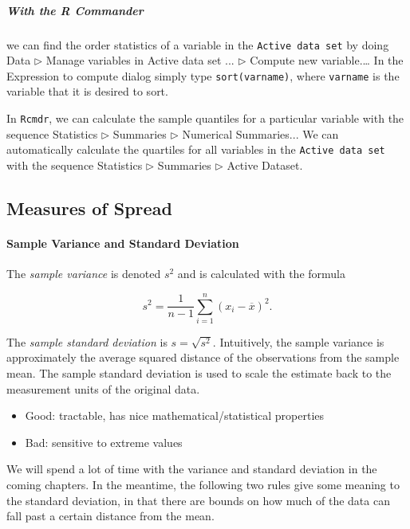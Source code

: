 \documentclass[captions=tableheading]{scrbook}
\begin{document}
\subparagraph*{With the \textsf{R} Commander}
we can find the order statistics of a variable in the \texttt{Active data set} by doing \textsf{Data \(\triangleright\) Manage variables in Active data set ... \(\triangleright\) Compute new variable}.\ldots{} In the \textsf{Expression to compute} dialog simply type \texttt{sort(varname)}, where \texttt{varname} is the variable that it is desired to sort.

In \texttt{Rcmdr}, we can calculate the sample quantiles for a particular variable with the sequence \textsf{Statistics \(\triangleright\) Summaries \(\triangleright\) Numerical Summaries}... We can automatically calculate the quartiles for all variables in the \texttt{Active data set} with the sequence \textsf{Statistics \(\triangleright\) Summaries \(\triangleright\) Active Dataset}.
\subsection{Measures of Spread}
\label{sec-2-3-4}

\label{sub:Measures-of-Spread}

\paragraph*{Sample Variance and Standard Deviation}

The \emph{sample variance} is denoted \(s^{2}\) and is calculated with the formula

\begin{equation}
s^{2}=\frac{1}{n-1}\sum_{i=1}^{n}(x_{i}-\overline{x})^{2}.
\end{equation}

The \emph{sample standard deviation} is \(s=\sqrt{s^{2}}\). Intuitively, the sample variance is approximately the average squared distance of the observations from the sample mean. The sample standard deviation is used to scale the estimate back to the measurement units of the original data.

\begin{itemize}
\item Good: tractable, has nice mathematical/statistical properties
\item Bad: sensitive to extreme values
\end{itemize}

We will spend a lot of time with the variance and standard deviation in the coming chapters. In the meantime, the following two rules give some meaning to the standard deviation, in that there are bounds on how much of the data can fall past a certain distance from the mean.
\end{document}
